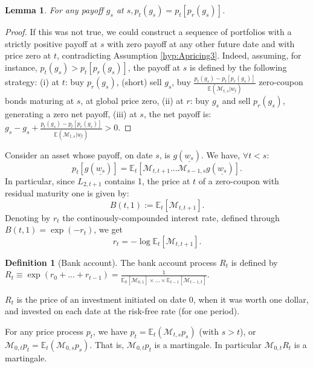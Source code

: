 \documentclass[
  12pt,
]{book}
\newtheorem{lemma}{Lemma}[chapter]
\theoremstyle{definition}
\newtheorem{definition}{Definition}[chapter]
\theoremstyle{definition}
\theoremstyle{definition}
\theoremstyle{definition}
\theoremstyle{remark}
\begin{document}
\begin{lemma}
\protect\hypertarget{lem:sdf}{}\label{lem:sdf}For any payoff \(g_s\) at \(s, p_t(g_s) = p_t[p_r(g_s)]\).
\end{lemma}

\begin{proof}
If this was not true, we could construct a sequence of portfolios with a strictly positive payoff at \(s\) with zero payoff at any other future date and with price zero at \(t\), contradicting Assumption \ref{hyp:Apricing3}. Indeed, assuming, for instance, \(p_t(g_s) > p_t[p_r(g_s)]\), the payoff at \(s\) is defined by the following strategy: (i) at \(t\): buy \(p_r(g_s)\), (short) sell \(g_s\), buy
\(\frac{p_t(g_s)-p_t[p_r(g_s)]}{\mathbb{E}(\mathcal{M}_{t,s}|\underline{w_t})}\) zero-coupon bonds maturing at \(s\), at global price zero, (ii) at \(r\): buy \(g_s\) and sell \(p_r(g_s)\), generating a zero net payoff, (iii) at \(s\), the net payoff is: \(g_s-g_s+\frac{p_t(g_s)-p_t[p_r(g_s)]}{\mathbb{E}(\mathcal{M}_{t,s}|\underline{w_t})} > 0\).
\end{proof}

Consider an asset whose payoff, on date \(s\), is \(g(\underline{w_s})\). We have, \(\forall t < s\):
\begin{equation}
\boxed{p_t[g(\underline{w_s})] = \mathbb{E}_t[\mathcal{M}_{t,t+1}...\mathcal{M}_{s-1,s}g(\underline{w_s})].}\label{eq:basic}
\end{equation}
In particular, since \(L_{2,t+1}\) contains 1, the price at \(t\) of a zero-coupon with residual maturity one is given by:
\[
B(t,1) := \mathbb{E}_t [\mathcal{M}_{t,t+1}].
\]
Denoting by \(r_t\) the continously-compounded interest rate, defined through \(B(t,1)=\exp(-r_{t})\), we get
\[
r_{t}=-\log \mathbb{E}_t [\mathcal{M}_{t,t+1}].
\]

\begin{definition}[Bank account]
\protect\hypertarget{def:bankaccount}{}\label{def:bankaccount}The bank account process \(R_t\) is defined by \(R_{t} \equiv \exp(r_0+...+r_{t-1}) = \frac{1}{\mathbb{E}_0[ \mathcal{M}_{0,1}]\times ... \times \mathbb{E}_{t-1} [\mathcal{M}_{t-1,t}]}\).

\(R_t\) is the price of an investment initiated on date 0, when it was worth one dollar, and invested on each date at the risk-free rate (for one period).
\end{definition}

For any price process \(p_t\), we have \(p_t = \mathbb{E}_t(\mathcal{M}_{t,s} p_s)\) (with \(s>t\)), or \(\mathcal{M}_{0,t} p_t = \mathbb{E}_t(\mathcal{M}_{0,s}p_s)\). That is, \(\mathcal{M}_{0,t} p_t\) is a martingale. In particular \(\mathcal{M}_{0,t} R_t\) is a martingale.
\end{document}
